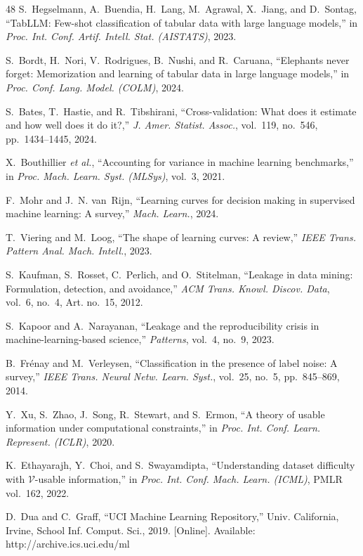 \begin{thebibliography}{48}
S.~Hegselmann, A.~Buendia, H.~Lang, M.~Agrawal, X.~Jiang, and D.~Sontag, ``TabLLM: Few-shot classification of tabular data with large language models,'' in \emph{Proc. Int. Conf. Artif. Intell. Stat. (AISTATS)}, 2023.

S.~Bordt, H.~Nori, V.~Rodrigues, B.~Nushi, and R.~Caruana, ``Elephants never forget: Memorization and learning of tabular data in large language models,'' in \emph{Proc. Conf. Lang. Model. (COLM)}, 2024.

S.~Bates, T.~Hastie, and R.~Tibshirani, ``Cross-validation: What does it estimate and how well does it do it?,'' \emph{J. Amer. Statist. Assoc.}, vol.~119, no.~546, pp.~1434--1445, 2024.

X.~Bouthillier \emph{et al.}, ``Accounting for variance in machine learning benchmarks,'' in \emph{Proc. Mach. Learn. Syst. (MLSys)}, vol.~3, 2021.

F.~Mohr and J.~N. van~Rijn, ``Learning curves for decision making in supervised machine learning: A survey,'' \emph{Mach. Learn.}, 2024.

T.~Viering and M.~Loog, ``The shape of learning curves: A review,'' \emph{IEEE Trans. Pattern Anal. Mach. Intell.}, 2023.

S.~Kaufman, S.~Rosset, C.~Perlich, and O.~Stitelman, ``Leakage in data mining: Formulation, detection, and avoidance,'' \emph{ACM Trans. Knowl. Discov. Data}, vol.~6, no.~4, Art. no.~15, 2012.

S.~Kapoor and A.~Narayanan, ``Leakage and the reproducibility crisis in machine-learning-based science,'' \emph{Patterns}, vol.~4, no.~9, 2023.

B.~Fr\'{e}nay and M.~Verleysen, ``Classification in the presence of label noise: A survey,'' \emph{IEEE Trans. Neural Netw. Learn. Syst.}, vol.~25, no.~5, pp.~845--869, 2014.

Y.~Xu, S.~Zhao, J.~Song, R.~Stewart, and S.~Ermon, ``A theory of usable information under computational constraints,'' in \emph{Proc. Int. Conf. Learn. Represent. (ICLR)}, 2020.

K.~Ethayarajh, Y.~Choi, and S.~Swayamdipta, ``Understanding dataset difficulty with $\mathcal{V}$-usable information,'' in \emph{Proc. Int. Conf. Mach. Learn. (ICML)}, PMLR vol.~162, 2022.

D.~Dua and C.~Graff, ``UCI Machine Learning Repository,'' Univ. California, Irvine, School Inf. Comput. Sci., 2019. [Online]. Available: http://archive.ics.uci.edu/ml


\end{thebibliography}
